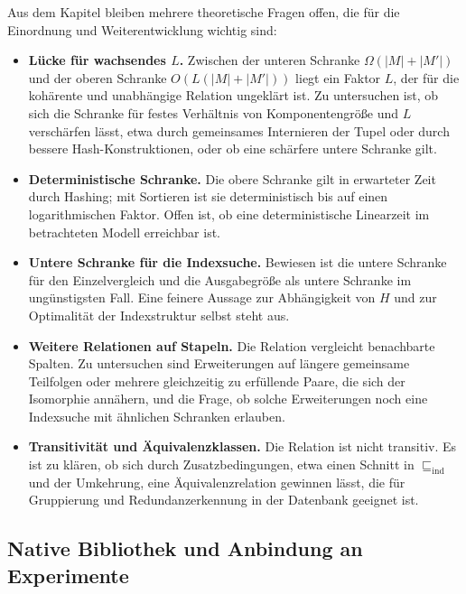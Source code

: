 \documentclass[a4paper,12pt, twoside]{report}
\theoremstyle{definition}
\begin{document}
Aus dem Kapitel bleiben mehrere theoretische Fragen offen, die für die Einordnung und Weiterentwicklung wichtig sind:
\begin{itemize}
	\item \textbf{Lücke für wachsendes $L$.} Zwischen der unteren Schranke $\Omega(|M|+|M'|)$ und der oberen Schranke $O(L(|M|+|M'|))$ liegt ein Faktor $L$, der für die kohärente und unabhängige Relation ungeklärt ist. Zu untersuchen ist, ob sich die Schranke für festes Verhältnis von Komponentengröße und $L$ verschärfen lässt, etwa durch gemeinsames Internieren der Tupel oder durch bessere Hash-Konstruktionen, oder ob eine schärfere untere Schranke gilt.
	\item \textbf{Deterministische Schranke.} Die obere Schranke gilt in erwarteter Zeit durch Hashing; mit Sortieren ist sie deterministisch bis auf einen logarithmischen Faktor. Offen ist, ob eine deterministische Linearzeit im betrachteten Modell erreichbar ist.
	\item \textbf{Untere Schranke für die Indexsuche.} Bewiesen ist die untere Schranke für den Einzelvergleich und die Ausgabegröße als untere Schranke im ungünstigsten Fall. Eine feinere Aussage zur Abhängigkeit von $H$ und zur Optimalität der Indexstruktur selbst steht aus.
	\item \textbf{Weitere Relationen auf Stapeln.} Die Relation vergleicht benachbarte Spalten. Zu untersuchen sind Erweiterungen auf längere gemeinsame Teilfolgen oder mehrere gleichzeitig zu erfüllende Paare, die sich der Isomorphie annähern, und die Frage, ob solche Erweiterungen noch eine Indexsuche mit ähnlichen Schranken erlauben.
	\item \textbf{Transitivität und Äquivalenzklassen.} Die Relation ist nicht transitiv. Es ist zu klären, ob sich durch Zusatzbedingungen, etwa einen Schnitt in $\sqsubseteq_{\mathrm{ind}}$ und der Umkehrung, eine Äquivalenzrelation gewinnen lässt, die für Gruppierung und Redundanzerkennung in der Datenbank geeignet ist.
\end{itemize}

\subsection{Native Bibliothek und Anbindung an Experimente}
\label{sec:ausb_univ_native}
\end{document}

